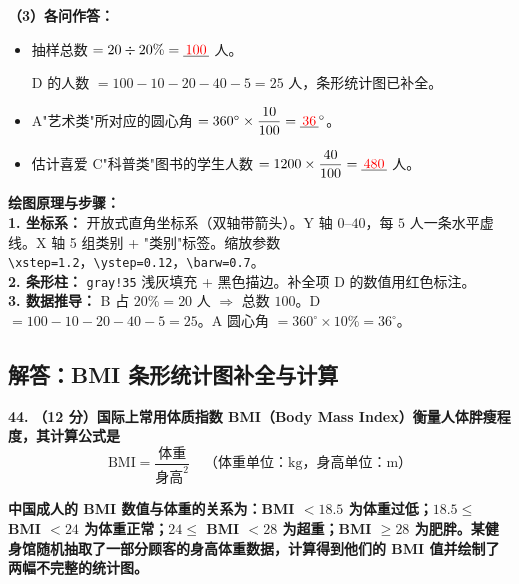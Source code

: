 \vspace{0.4cm}
\textbf{（3）各问作答：}

\begin{itemize}
    \item[\textbf{(1)}] 抽样总数 $= 20 \div 20\% = \underline{\textcolor{red}{\,100\,}}$ 人。

    D 的人数 $= 100 - 10 - 20 - 40 - 5 = 25$ 人，条形统计图已补全。

    \item[\textbf{(2)}] A"艺术类"所对应的圆心角 $= 360^\circ \times \dfrac{10}{100} = \underline{\textcolor{red}{\,36\,}}^\circ$。

    \item[\textbf{(3)}] 估计喜爱 C"科普类"图书的学生人数 $= 1200 \times \dfrac{40}{100} = \underline{\textcolor{red}{\,480\,}}$ 人。
\end{itemize}

\vspace{0.4cm}
{\small\color{blue!70!black}
\textbf{绘图原理与步骤：}\\
\textbf{1. 坐标系：} 开放式直角坐标系（双轴带箭头）。Y 轴 $0$--$40$，每 $5$ 人一条水平虚线。X 轴 5 组类别 + "类别"标签。缩放参数 \texttt{\textbackslash{}xstep=1.2}，\texttt{\textbackslash{}ystep=0.12}，\texttt{\textbackslash{}barw=0.7}。\\
\textbf{2. 条形柱：} \texttt{gray!35} 浅灰填充 + 黑色描边。补全项 D 的数值用红色标注。\\
\textbf{3. 数据推导：} B 占 $20\% = 20$ 人 $\Rightarrow$ 总数 $100$。D $= 100 - 10 - 20 - 40 - 5 = 25$。A 圆心角 $= 360^\circ \times 10\% = 36^\circ$。
}

\newpage

\newpage

\subsection{解答：BMI 条形统计图补全与计算}

\vspace{0.6cm}

\textbf{\LARGE 44.} \textbf{（12 分）国际上常用体质指数 BMI（Body Mass Index）衡量人体胖瘦程度，其计算公式是}
$$\text{BMI} = \frac{\text{体重}}{\text{身高}^2} \quad \text{（体重单位：kg，身高单位：m）}$$

\textbf{中国成人的 BMI 数值与体重的关系为：BMI $< 18.5$ 为体重过低；$18.5 \leqslant$ BMI $< 24$ 为体重正常；$24 \leqslant$ BMI $< 28$ 为超重；BMI $\geqslant 28$ 为肥胖。某健身馆随机抽取了一部分顾客的身高体重数据，计算得到他们的 BMI 值并绘制了两幅不完整的统计图。}

